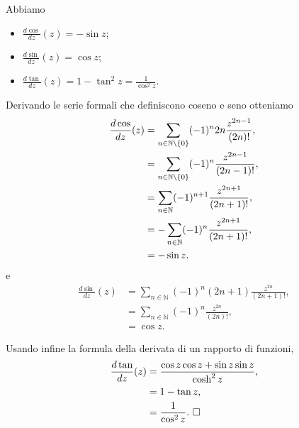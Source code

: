 \begin{Theorem}
  Abbiamo
  \begin{itemize}
    \item $\frac{d\cos}{dz}(z) = - \sin z$;
    \item $\frac{d\sin}{dz}(z) = \cos z$;
    \item $\frac{d\tan}{dz}(z) = 1 - \tan^2 z = \frac{1}{\cos^2 z}$.
  \end{itemize}
\end{Theorem}
\Proof Derivando le serie formali che definiscono coseno e
seno otteniamo
\begin{align*}
  \frac{d\cos}{dz}(z)
    &= \sum_{n \in \mathbb{N} \setminus \lbrace 0 \rbrace} (-1)^n 2n \frac{z^{2n - 1}}{(2n)!},\\
    &= \sum_{n \in \mathbb{N} \setminus \lbrace 0 \rbrace} (-1)^n \frac{z^{2n - 1}}{(2n - 1)!},\\
    &= \sum_{n \in \mathbb{N}} (-1)^{n + 1} \frac{z^{2n + 1}}{(2n + 1)!},\\
    &= - \sum_{n \in \mathbb{N}} (-1)^n \frac{z^{2n + 1}}{(2n + 1)!},\\
    &= - \sin z.
\end{align*}
e
\begin{align*}
  \frac{d\sin}{dz}(z)
    &= \sum_{n \in \mathbb{N}} (-1)^n (2n + 1)\frac{z^{2n}}{(2n + 1)!},\\
    &= \sum_{n \in \mathbb{N}} (-1)^n \frac{z^{2n}}{(2n)!},\\
    &= \cos z.
\end{align*}
\par Usando infine la formula della derivata di un rapporto di funzioni,
\begin{align*}
  \frac{d\tan}{dz}(z)
    &= \frac{\cos z \cos z + \sin z \sin z}{\cosh^2 z},\\
    &= 1 - \tan z,\\
    &= \frac{1}{\cos^2 z}.\text{ $\square$}
\end{align*}
